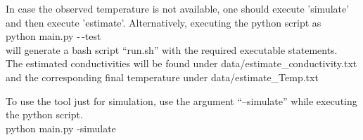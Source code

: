 \documentclass[10pt,a4paper]{report}
\begin{document}
In case the observed temperature is not available, one should execute 'simulate' and then execute 'estimate'. Alternatively, executing the python script as \\

python main.py  -\,-test\\

will generate a bash script “run.sh” with the required executable statements.\\

The estimated conductivities will be found under data/estimate\_conductivity.txt and the corresponding final temperature under data/estimate\_Temp.txt

To use the tool just for simulation, use the argument “--simulate” while executing the python script.\\

python main.py -simulate
\end{document}
